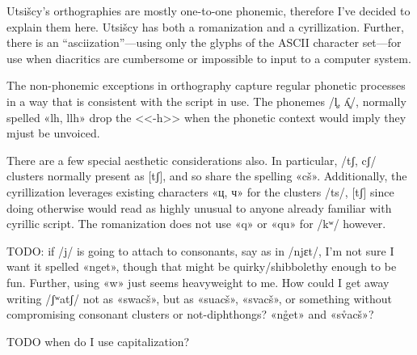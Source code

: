 \documentclass[12pt]{book} %
\begin{document}
Utsišcy's orthographies are mostly one-to-one phonemic, therefore I've decided to explain them here.
Utsišcy has both a romanization and a cyrillization.
Further, there is an ``asciization''---using only the glyphs of the ASCII character set---for use when diacritics are cumbersome or impossible to input to a computer system.

The non-phonemic exceptions in orthography capture regular phonetic processes in a way that is consistent with the script in use.
The phonemes /l̥, ʎ̥/, normally spelled «lh, llh» drop the <<-h>> when the phonetic context would imply they mjust be unvoiced.

There are a few special aesthetic considerations also.
In particular, /tʃ, cʃ/ clusters normally present as [tʃ], and so share the spelling «cš».
Additionally, the cyrillization leverages existing characters «ц, ч» for the clusters /ts/, [tʃ] since doing otherwise would read as highly unusual to anyone already familiar with cyrillic script.
The romanization does not use «q» or «qu» for /kʷ/ however.


TODO: if /j/ is going to attach to consonants, say as in /njɛt/, I'm not sure I want it spelled «nget», though that might be quirky/shibbolethy enough to be fun.
Further, using «w» just seems heavyweight to me. How could I get away writing /ʃʷatʃ/ not as «swacš», but as «suacš», «svacš», or something without compromising consonant clusters or not-diphthongs?
«ng̊et» and «sv̊acš»?

TODO when do I use capitalization?
\end{document}

